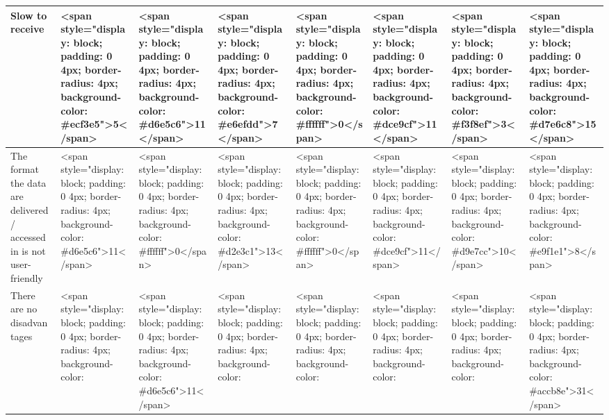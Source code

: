 \documentclass[
]{article}
\begin{document}
\begin{table}
\begin{tabular}[t]{l|l|l|l|l|l|l|l}
\hline
\hspace{1em}Slow to receive & <span style="display: block; padding: 0 4px; border-radius: 4px; background-color: #ecf3e5">5</span> & <span style="display: block; padding: 0 4px; border-radius: 4px; background-color: #d6e5c6">11</span> & <span style="display: block; padding: 0 4px; border-radius: 4px; background-color: #e6efdd">7</span> & <span style="display: block; padding: 0 4px; border-radius: 4px; background-color: #ffffff">0</span> & <span style="display: block; padding: 0 4px; border-radius: 4px; background-color: #dce9cf">11</span> & <span style="display: block; padding: 0 4px; border-radius: 4px; background-color: #f3f8ef">3</span> & <span style="display: block; padding: 0 4px; border-radius: 4px; background-color: #d7e6c8">15</span>\\
\hline
\hspace{1em}The format the data are delivered / accessed in is not user-friendly & <span style="display: block; padding: 0 4px; border-radius: 4px; background-color: #d6e5c6">11</span> & <span style="display: block; padding: 0 4px; border-radius: 4px; background-color: #ffffff">0</span> & <span style="display: block; padding: 0 4px; border-radius: 4px; background-color: #d2e3c1">13</span> & <span style="display: block; padding: 0 4px; border-radius: 4px; background-color: #ffffff">0</span> & <span style="display: block; padding: 0 4px; border-radius: 4px; background-color: #dce9cf">11</span> & <span style="display: block; padding: 0 4px; border-radius: 4px; background-color: #d9e7cc">10</span> & <span style="display: block; padding: 0 4px; border-radius: 4px; background-color: #e9f1e1">8</span>\\
\hline
\hspace{1em}There are no disadvantages & <span style="display: block; padding: 0 4px; border-radius: 4px; background-color: #629d28">42</span> & <span style="display: block; padding: 0 4px; border-radius: 4px; background-color: #d6e5c6">11</span> & <span style="display: block; padding: 0 4px; border-radius: 4px; background-color: #75a942">40</span> & <span style="display: block; padding: 0 4px; border-radius: 4px; background-color: #649e2a">50</span> & <span style="display: block; padding: 0 4px; border-radius: 4px; background-color: #84b256">39</span> & <span style="display: block; padding: 0 4px; border-radius: 4px; background-color: #7cad4c">35</span> & <span style="display: block; padding: 0 4px; border-radius: 4px; background-color: #accb8e">31</span>\\
\hline

\end{tabular}
\end{table}
\end{document}
